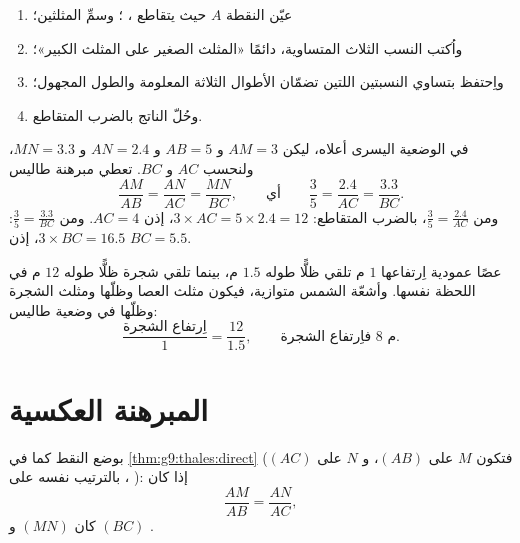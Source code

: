 \begin{method}\label{met:g9:thales:compute}
\begin{enumerate}
  \item عيّن النقطة $A$ حيث يتقاطع ،
         ؛ وسمِّ المثلثين؛
  \item واُكتب النسب الثلاث المتساوية، دائمًا «المثلث الصغير على
        المثلث الكبير»؛
  \item واِحتفظ بتساوي النسبتين اللتين تضمّان الأطوال الثلاثة
        المعلومة والطول المجهول؛
  \item وحُلّ  الناتج بالضرب المتقاطع.
\end{enumerate}
\end{method}

\begin{example}\label{ex:g9:thales:compute}
في الوضعية اليسرى أعلاه، ليكن $AM = 3$ و $AB = 5$ و $AN = 2.4$
و $MN = 3.3$، ولنحسب $AC$ و $BC$. تعطي مبرهنة طاليس
\[
\frac{AM}{AB} = \frac{AN}{AC} = \frac{MN}{BC},
\qquad\text{أي}\qquad
\frac35 = \frac{2.4}{AC} = \frac{3.3}{BC}.
\]
ومن $\frac35 = \frac{2.4}{AC}$، بالضرب المتقاطع:
$3 \times AC = 5 \times 2.4 = 12$، إذن $AC = 4$. ومن
$\frac35 = \frac{3.3}{BC}$: $3 \times BC = 16.5$، إذن $BC = 5.5$.
\end{example}

\begin{example}\label{ex:g9:thales:stick}
عصًا عمودية اِرتفاعها $1$ م تلقي ظلًّا طوله $1.5$ م، بينما تلقي
شجرة ظلًّا طوله $12$ م في اللحظة نفسها. وأشعّة الشمس
متوازية، فيكون مثلث العصا وظلّها ومثلث الشجرة وظلّها في وضعية
طاليس:
\[
\frac{\text{اِرتفاع الشجرة}}{1} = \frac{12}{1.5},
\qquad\text{فاِرتفاع الشجرة } 8 \text{ م.}
\]
\end{example}

\section{المبرهنة العكسية}

\begin{theorem}\label{thm:g9:thales:converse}
بوضع النقط كما في \cref{thm:g9:thales:direct} (فتكون $M$ على $(AB)$،
و $N$ على $(AC)$، بالترتيب نفسه على ):
إذا كان
\[
\frac{AM}{AB} = \frac{AN}{AC},
\]
كان  $(MN)$ و $(BC)$ .
\end{theorem}
\admitted

